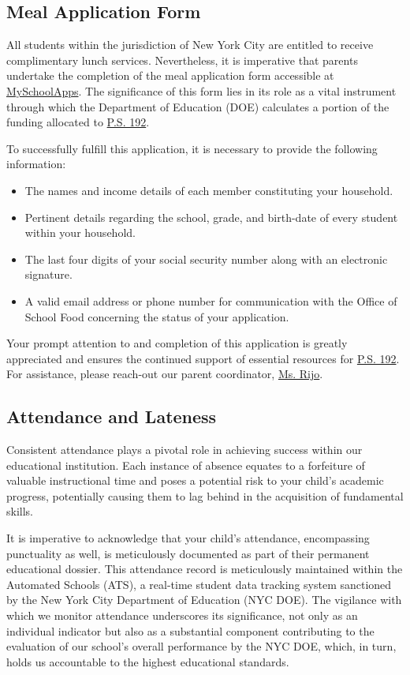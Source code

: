 \documentclass[11pt, letterpaper]{article}
\begin{document}
\subsection{Meal Application Form}
All students within the jurisdiction of New York City are entitled to receive complimentary lunch services. Nevertheless, it is imperative that parents undertake the completion of the meal application form accessible at \href{https://www.myschoolapps.com/}{MySchoolApps}. The significance of this form lies in its role as a vital instrument through which the Department of Education (DOE) calculates a portion of the funding allocated to \href{https://www.ps192.org}{P.S. 192}.

To successfully fulfill this application, it is necessary to provide the following information:
\begin{itemize}
\item The names and income details of each member constituting your household.
\item Pertinent details regarding the school, grade, and birth-date of every student within your household.
\item The last four digits of your social security number along with an electronic signature.
\item A valid email address or phone number for communication with the Office of School Food concerning the status of your application.
\end{itemize}
Your prompt attention to and completion of this application is greatly appreciated and ensures the continued support of essential resources for \href{https://www.ps192.org}{P.S. 192}. For assistance, please reach-out our parent coordinator, \href{arijo@schools.nyc.gov}{Ms. Rijo}.

\subsection{Attendance and Lateness}
Consistent attendance plays a pivotal role in achieving success within our educational institution. Each instance of absence equates to a forfeiture of valuable instructional time and poses a potential risk to your child's academic progress, potentially causing them to lag behind in the acquisition of fundamental skills.

It is imperative to acknowledge that your child's attendance, encompassing punctuality as well, is meticulously documented as part of their permanent educational dossier. This attendance record is meticulously maintained within the Automated Schools (ATS), a real-time student data tracking system sanctioned by the New York City Department of Education (NYC DOE). The vigilance with which we monitor attendance underscores its significance, not only as an individual indicator but also as a substantial component contributing to the evaluation of our school's overall performance by the NYC DOE, which, in turn, holds us accountable to the highest educational standards.
\end{document}
